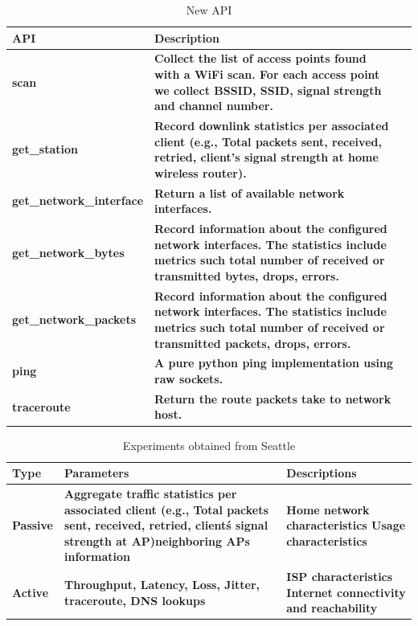 \documentclass[conference]{IEEEtran}   	%
\begin{document}
\begin{table}
\scriptsize
\centering
\begin{tabular}{|p{}| p{}| m{}|}
\hline
\textbf{API}    &  \textbf{Description} \\
 \hline
 {\bf scan} & {\bf Collect the list of access points found with a WiFi scan. For each access point we collect BSSID, SSID, signal strength and channel number.} \\
\hline
 {\bf get\_station} & {\bf Record downlink statistics per associated client (e.g., Total packets sent, received, retried, client's signal strength at home wireless router).} \\
\hline
 {\bf get\_network\_interface} & {\bf Return a list of available network interfaces.} \\
\hline
 {\bf get\_network\_bytes} & {\bf Record information about the configured network interfaces. The statistics include metrics such total number of received or transmitted bytes, drops, errors.} \\
\hline
 {\bf get\_network\_packets} & {\bf Record information about the configured network interfaces. The statistics include metrics such total number of received or transmitted packets, drops, errors.} \\
\hline
 {\bf ping} & {\bf A pure python ping implementation using raw sockets.} \\
\hline
 {\bf traceroute} & {\bf Return the route packets take to network host. } \\
\hline
\end{tabular}
\caption {New API }
\label{table:api_design}
\end{table}

\begin{table} 
\scriptsize
\centering
\begin{tabular}{|p{}| p{}| m{}|}
\hline
\textbf{Type} & \textbf{Parameters} & \textbf{Descriptions} \\
 \hline
 {\bf Passive} & {\bf Aggregate traffic statistics per associated client (e.g., Total packets sent, received, retried,
client\'s signal strength at AP)\newline neighboring APs information} & {\bf Home network characteristics \newline Usage characteristics} \\
\hline
 {\bf Active} & {\bf Throughput, Latency, Loss, Jitter, traceroute, DNS lookups} & {\bf ISP characteristics \newline Internet connectivity and reachability} \\
\hline
\end{tabular}
\caption {Experiments obtained from Seattle}
\label{table:experiment}
\end{table}
\end{document}
